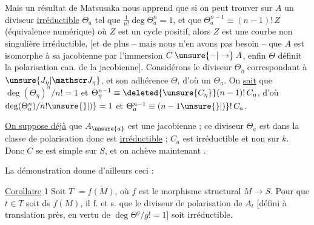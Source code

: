 Mais un résultat de Matsusaka  nous apprend que si on peut trouver sur $A$ un diviseur  \uline{irréductible} $\Theta_a$ tel que  $\frac{1}{n!}\deg\Theta_{a}^n=1$,  et que $\Theta_a^{n-1}\equiv(n-1)!\,Z$ (équivalence numérique) où $Z$ est un cycle positif, alors $Z$ est  une courbe non singulière irréductible, [et de plus -- mais nous n'en avons pas besoin -- que $A$ est isomorphe à sa jacobienne \deleted{\unsure{]}} par l'immersion $C\mathbin{\unsure{-|\to}}A$, enfin $\Theta$ définit la polarisation can. de la jacobienne].
  Considérons le diviseur $\Theta_\eta$ correspondant à $\unsure{J_\eta|\mathscr J_\eta}$, et son adhérence $\Theta$, d'où un $\Theta_a$. On \uline{sait} que $\deg(\Theta_\eta)^n/n!=1$ et $\Theta_\eta^{n-1}\equiv\deleted{\unsure{C_\eta}}(n-1)!\,C_\eta$, d'où $\deg(\Theta_a^n)/n!\unsure{\}|)}=1$ et $\Theta_a^{n-1}\equiv(n-1\unsure{\}|)}!\,C_a$.  



  \uline{On suppose déjà} que $A_{\unsure{a}}$ est une jacobienne  ;  ce diviseur $\Theta_a$ est dans la classe de polarisation donc est \uline{irréductible} ;  $C_a$ est irréductible et non  sur $k$. Donc $C$ se  est simple sur $S$, et on achève maintenant .

La démonstration donne d'ailleurs ceci :

 \uline{Corollaire} 1 Soit $T$  $=\overline{f(M)}$, où $f$ est le morphisme structural $M\to S$. Pour que $t\in T$ soit ds $f(M)$, il f. et s. que le diviseur de polarisation de $A_t$ [défini à translation près, en vertu de $\deg\Theta^g/g!=1$] soit  irréductible. 

